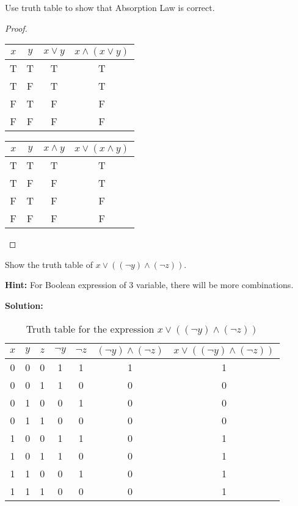         \begin{exercise}
            Use truth table to show that Absorption Law is correct.
        \end{exercise}
        \begin{proof}
            \begin{tabular}{cc|c|c}
                \hline
                \( x \) & \( y \) & $x \lor y$&\( x \land (x \lor y) \) \\
                \hline
                T & T & T & T \\
                T & F & T & T \\
                F & T & F & F \\
                F & F & F & F \\
                \hline
            \end{tabular}
            \quad
            \begin{tabular}{cc|c|c}
                \hline
                \( x \) & \( y \)&$x \land y$ & \( x \lor (x \land y) \) \\
                \hline
                T & T& T& T \\
                T & F& F& T \\
                F & T& F& F \\
                F & F& F& F \\
                \hline
            \end{tabular}
        \end{proof}

        \begin{exercise}
            Show the truth table of $\displaystyle x\lor (( \lnot y) \land ( \lnot z))$.
        \end{exercise}
        \textbf{Hint:} For Boolean expression of 3 variable, there will be more combinations.
        
        \textbf{Solution:}

        \begin{table}[ht]
            \centering
            \caption{Truth table for the expression \( x \lor ((\lnot y) \land (\lnot z)) \)}
            \begin{tabular}{ccc|c|c|c|c}
            \hline
            \( x \) & \( y \) & \( z \) & \( \lnot y \) & \( \lnot z \)& $(\lnot y) \land (\lnot z)$ & \( x \lor ((\lnot y) \land (\lnot z)) \) \\
            \hline
            0 & 0 & 0 & 1 & 1 &1& 1 \\
            0 & 0 & 1 & 1 & 0 &0& 0 \\
            0 & 1 & 0 & 0 & 1 &0& 0 \\
            0 & 1 & 1 & 0 & 0 &0& 0 \\
            1 & 0 & 0 & 1 & 1 &0& 1 \\
            1 & 0 & 1 & 1 & 0 &0& 1 \\
            1 & 1 & 0 & 0 & 1 &0& 1 \\
            1 & 1 & 1 & 0 & 0 &0& 1 \\
            \hline
            \end{tabular}
 
        \end{table}

